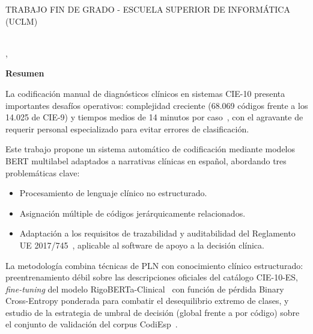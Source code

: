 \pagestyle{plain}	%

%
% 
%

\makeatletter
\begin{center} %
 {\textsc{TRABAJO FIN DE GRADO - ESCUELA SUPERIOR DE INFORMÁTICA 
 (UCLM)}\par} %
 \vspace{1cm} %
 {\textbf{\Large\@tituloCorto}\par} %
 \vspace{0.4cm} %
 {\@autor \\ \@cityTF,{} \@mesTF{} \@yearTF\par} 
 \vspace{0.9cm} %
 {\textbf{\large\textsf{Resumen}}\par} %
\end{center} 
\makeatother %
La codificación manual de diagnósticos clínicos en sistemas CIE-10 presenta importantes desafíos operativos: complejidad creciente (68.069 códigos frente a los 14.025 de CIE-9) y tiempos medios de 14 minutos por caso~\cite{sanidad2016cie10,gogorcena2017cie10es}, con el agravante de requerir personal especializado para evitar errores de clasificación.

Este trabajo propone un sistema automático de codificación mediante modelos BERT multilabel adaptados a narrativas clínicas en español, abordando tres problemáticas clave:

\begin{itemize}
 \item Procesamiento de lenguaje clínico no estructurado.
 \item Asignación múltiple de códigos jerárquicamente relacionados.
 \item Adaptación a los requisitos de trazabilidad y auditabilidad del Reglamento UE 2017/745~\cite{eu2017745}, aplicable al software de apoyo a la decisión clínica.
\end{itemize}

La metodología combina técnicas de PLN con conocimiento clínico estructurado: preentrenamiento débil sobre las descripciones oficiales del catálogo CIE-10-ES, \emph{fine-tuning} del modelo RigoBERTa-Clinical~\cite{garciasubies2026rigobertaclinical} con función de pérdida Binary Cross-Entropy ponderada para combatir el desequilibrio extremo de clases, y estudio de la estrategia de umbral de decisión (global frente a por código) sobre el conjunto de validación del corpus CodiEsp~\cite{miranda2020}.

